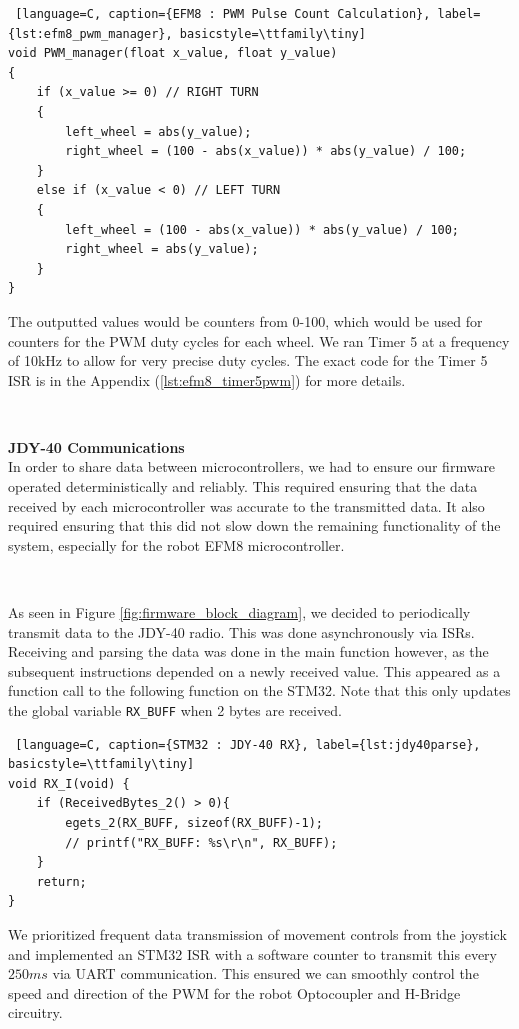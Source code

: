 \documentclass{article}
\begin{document}
\begin{lstlisting} [language=C, caption={EFM8 : PWM Pulse Count Calculation}, label={lst:efm8_pwm_manager}, basicstyle=\ttfamily\tiny]
void PWM_manager(float x_value, float y_value)
{
    if (x_value >= 0) // RIGHT TURN
    {
        left_wheel = abs(y_value);
        right_wheel = (100 - abs(x_value)) * abs(y_value) / 100;
    }
    else if (x_value < 0) // LEFT TURN
    {
        left_wheel = (100 - abs(x_value)) * abs(y_value) / 100;
        right_wheel = abs(y_value);
    }
}
\end{lstlisting}

The outputted values would be counters from 0-100, which would be used for counters for the PWM duty cycles for each wheel. We ran Timer 5 at a frequency of 10kHz to allow for very precise duty cycles. The exact code for the Timer 5 ISR is in the Appendix (\ref{lst:efm8_timer5pwm}) for more details.

\

\textbf{JDY-40 Communications} \\


In order to share data between microcontrollers, we had to ensure our firmware operated deterministically and reliably.
This required ensuring that the data received by each microcontroller was accurate to the transmitted data. It also required ensuring
that this did not slow down the remaining functionality of the system, especially for the robot EFM8 microcontroller.

\

As seen in Figure \ref{fig:firmware_block_diagram}, we decided to periodically transmit data to the JDY-40 radio. This was done
asynchronously via ISRs. Receiving and parsing the data was done in the main function however,
as the subsequent instructions depended on a newly received value. This appeared as a function call to the following function on the STM32.
Note that this only updates the global variable \texttt{RX\_BUFF} when 2 bytes are received.

\begin{lstlisting} [language=C, caption={STM32 : JDY-40 RX}, label={lst:jdy40parse}, basicstyle=\ttfamily\tiny]
void RX_I(void) {
	if (ReceivedBytes_2() > 0){
		egets_2(RX_BUFF, sizeof(RX_BUFF)-1);
		// printf("RX_BUFF: %s\r\n", RX_BUFF);
	}
	return;
}
\end{lstlisting}

We prioritized frequent data transmission of movement controls from the joystick and implemented an STM32 ISR with a software counter
to transmit this every $250 ms$ via UART communication. This ensured we can smoothly control the speed and
direction of the PWM for the robot Optocoupler and H-Bridge circuitry.
\end{document}
